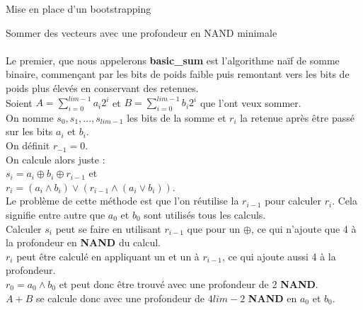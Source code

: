 \begin{section}{Mise en place d'un bootstrapping}
\begin{subsection}{Sommer des vecteurs avec une profondeur en NAND minimale}
\paragraph{}

Le premier, que nous appelerons \textbf{basic\_sum} est l'algorithme naïf de somme binaire, commençant par les bits de poids faible puis remontant vers les bits de poids plus élevés en conservant des retenues. \\
Soient $A = \sum\limits_{i=0}^{lim-1} a_i 2^i$ et $B = \sum\limits_{i=0}^{lim-1} b_i 2^i$ que l'ont veux sommer. \\
On nomme $s_0, s_1, ..., s_{lim-1}$ les bits de la somme et $r_i$ la retenue après être passé sur les bits $a_i$ et $b_i$. \\
On définit $r_{-1} = 0$. \\
On calcule alors juste : \\
$s_i = a_i \oplus b_i \oplus r_{i-1}$ et \\
$r_i = (a_i \land b_i) \lor (r_{i-1} \land (a_i \lor b_i))$. \\
Le problème de cette méthode est que l'on réutilise la $r_{i-1}$ pour calculer $r_i$. Cela signifie entre autre que $a_0$ et $b_0$ sont utilisés tous les calculs. \\
Calculer $s_i$ peut se faire en utilisant $r_{i-1}$ que pour un $\oplus$, ce qui n'ajoute que 4 à la profondeur en \textbf{NAND} du calcul. \\
$r_i$ peut être calculé en appliquant un  et un  à $r_{i-1}$, ce qui ajoute aussi 4 à la profondeur. \\
$r_0 = a_0 \land b_0$ et peut donc être trouvé avec une profondeur de 2 \textbf{NAND}. \\
$A + B$ se calcule donc avec une profondeur de $4 lim - 2$ \textbf{NAND} en $a_0$ et $b_0$.

\paragraph{}


\end{subsection}
\end{section}
